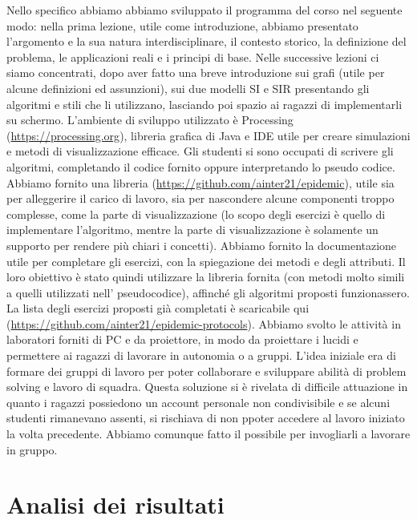 Nello specifico abbiamo abbiamo sviluppato il programma del corso nel seguente modo: nella prima lezione, utile come introduzione, abbiamo presentato l’argomento e la sua natura interdisciplinare, il contesto storico, la definizione del problema, le applicazioni reali e i principi di base.
Nelle successive lezioni ci siamo concentrati, dopo aver fatto una breve introduzione sui grafi (utile per alcune definizioni ed assunzioni), sui due modelli SI e SIR presentando gli algoritmi e stili che li utilizzano, lasciando poi spazio ai ragazzi di implementarli su schermo. L’ambiente di sviluppo utilizzato è Processing (\href{https://processing.org}{https://processing.org}), libreria grafica di Java e IDE utile per creare simulazioni e metodi di visualizzazione efficace. Gli studenti si sono occupati di scrivere gli algoritmi, completando il codice fornito oppure interpretando lo pseudo codice. Abbiamo fornito una libreria (\href{https://github.com/ainter21/epidemic}{https://github.com/ainter21/epidemic}), utile sia per alleggerire il carico di lavoro, sia per nascondere alcune componenti troppo complesse, come la parte di visualizzazione (lo scopo degli esercizi è quello di implementare l’algoritmo, mentre la parte di visualizzazione è solamente un supporto per rendere più chiari i concetti).
Abbiamo fornito la documentazione utile per completare gli esercizi, con la spiegazione dei metodi e degli attributi. Il loro obiettivo è stato quindi utilizzare la libreria fornita (con metodi molto simili a quelli utilizzati nell' pseudocodice), affinché gli algoritmi proposti funzionassero. La lista degli esercizi proposti già completati è scaricabile qui (\href{https://github.com/ainter21/epidemic-protocols}{https://github.com/ainter21/epidemic-protocols}).
Abbiamo svolto le attività in laboratori forniti di PC e da proiettore, in modo da proiettare i lucidi e permettere ai ragazzi di lavorare in autonomia o a gruppi. L'idea iniziale era di formare dei gruppi di lavoro per poter collaborare e sviluppare abilità di problem solving e lavoro di squadra. Questa soluzione si  è rivelata di difficile attuazione in quanto i ragazzi possiedono un account personale non condivisibile e se alcuni studenti rimanevano assenti, si rischiava di non ppoter accedere al lavoro iniziato la volta precedente. Abbiamo comunque fatto il possibile per invogliarli a lavorare in gruppo.
\section{Analisi dei risultati}

